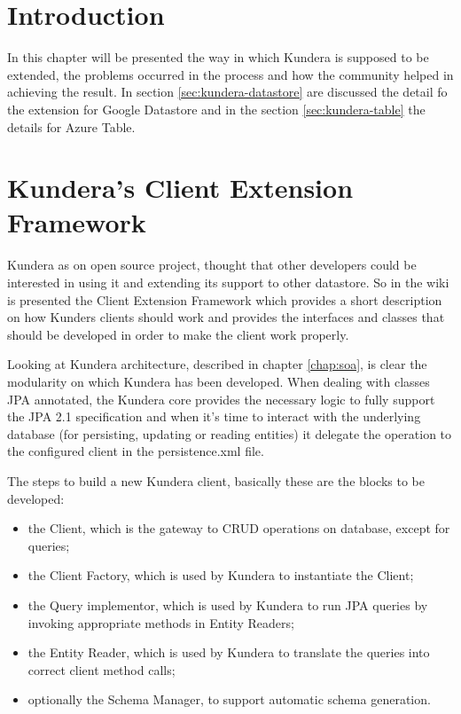 \section{Introduction}
In this chapter will be presented the way in which Kundera is supposed to be extended, the problems occurred in the process and how the community helped in achieving the result.
In section \ref{sec:kundera-datastore} are discussed the detail fo the extension for Google Datastore and in the section \ref{sec:kundera-table} the details for Azure Table.

\section{Kundera's Client Extension Framework}
Kundera as on open source project, thought that other developers could be interested in using it and extending its support to other datastore.
So in the wiki is presented the Client Extension Framework which provides a short description on how Kunders clients should work and provides the interfaces and classes that should be developed in order to make the client work properly.

Looking at Kundera architecture, described in chapter \ref{chap:soa}, is clear the modularity on which Kundera has been developed. When dealing with classes JPA annotated, the Kundera core provides the necessary logic to fully support the JPA 2.1 specification and when it's time to interact with the underlying database (for persisting, updating or reading entities) it delegate the operation to the configured client in the persistence.xml file.

The steps to build a new Kundera client, basically these are the blocks to be developed:
\begin{itemize}
\item the Client, which is the gateway to CRUD operations on database, except for queries;
\item the Client Factory, which is used by Kundera to instantiate the Client;
\item the Query implementor, which is used by Kundera to run JPA queries by invoking appropriate methods in Entity Readers;
\item the Entity Reader, which is used by Kundera to translate the queries into correct client
method calls;
\item optionally the Schema Manager, to support automatic schema generation.
\end{itemize}

